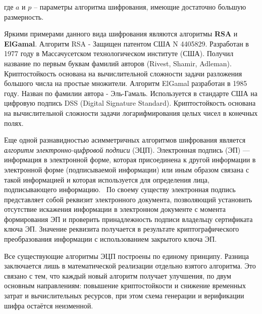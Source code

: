 где $a$ и $p$ -- параметры алгоритма шифрования, имеющие достаточно большую
размерность.

Яркими примерами данного вида шифрования являются алгоритмы \textbf{RSA} и
\textbf{ElGamal}.
Алгоритм RSA - Защищен патентом США N 4405829. Разработан в 1977 году в
Массачусетском технологическом институте (США). Получил название по первым
буквам фамилий авторов (Rivest, Shamir, Adleman). Криптостойкость основана на
вычислительной сложности задачи разложения большого числа на простые множители.
Алгоритм ElGamal разработан в 1985 году. Назван по фамилии автора - Эль-Гамаль.
Используется в стандарте США на цифровую подпись DSS (Digital Signature
Standard). Криптостойкость основана на вычислительной сложности задачи
логарифмирования целых чисел в конечных полях.~\cite{elgamal}

Еще одной разнавидностью асимметричных алгоритмов шифрования является
\textit{алгоритм электронно-цифровой подписи} (ЭЦП). Электронная подпись (ЭП) —
информация в электронной форме, которая присоединена к другой информации в электронной форме
(подписываемой информации) или иным образом связана с такой информацией и
которая используется для определения лица, подписывающего информацию.~\cite{FZ_63}
По своему существу электронная подпись представляет собой реквизит электронного
документа, позволяющий установить отсутствие искажения информации в электронном
документе с момента формирования ЭП и проверить принадлежность подписи владельцу
сертификата ключа ЭП. Значение реквизита получается в результате
криптографического преобразования информации с использованием закрытого ключа
ЭП.

Все существующие алгоритмы ЭЦП построены по единому принципу.
Разница заключается лишь в математической реализации отдельно взятого алгоритма.
Это связано с тем, что каждый новый алгоритм получает улучшения, по двум
основным направлениям:
повышение криптостойкости и снижение временных затрат и вычислительных ресурсов,
при этом схема генерации и верификации шифра остаётся неизменной.

